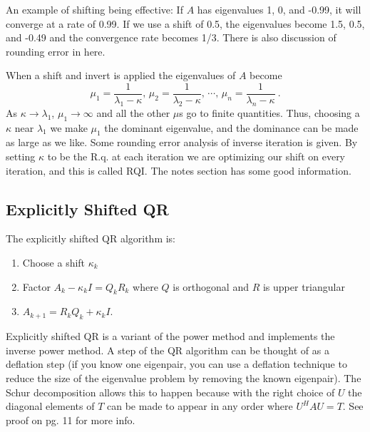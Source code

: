 \documentclass[12pt,twoside]{article}
\newcommand{\evall}{eigenvalue}
\newcommand{\evals}{eigenvalues }
\begin{document}
An example of shifting being effective: If $A$ has \evals 1, 0, and -0.99, it will converge at a rate of 0.99. If we use a shift of 0.5, the \evals become 1.5, 0.5, and -0.49 and the convergence rate becomes 1/3. There is also discussion of rounding error in here. 

When a shift and invert is applied the \evals of $A$ become 
%
\begin{equation}
  \mu_1 = \frac{1}{\lambda_1 - \kappa}\text{,   }  \mu_2 = \frac{1}{\lambda_2 - \kappa}\text{,   } \cdots\text{,   }  \mu_n = \frac{1}{\lambda_n - \kappa} \:.
\end{equation}
%
As $\kappa \to \lambda_1$, $\mu_1 \to \infty$ and all the other $\mu$s go to finite quantities. Thus, choosing a $\kappa$ near $\lambda_1$ we make $\mu_1$ the dominant \evall, and the dominance can be made as large as we like. Some rounding error analysis of inverse iteration is given. By setting $\kappa$ to be the R.q. at each iteration we are optimizing our shift on every iteration, and this is called RQI. The notes section has some good information. 

\subsection{Explicitly Shifted QR}
The explicitly shifted QR algorithm is:
\begin{enumerate}
  \item Choose a shift $\kappa_k$
  \item Factor $A_k - \kappa_k I = Q_k R_k$ where $Q$ is orthogonal and $R$ is upper triangular
  \item $A_{k+1} = R_kQ_k + \kappa_k I.$
\end{enumerate}

Explicitly shifted QR is a variant of the power method and implements the inverse power method. A step of the QR algorithm can be thought of as a deflation step (if you know one eigenpair, you can use a deflation technique to reduce the size of the eigenvalue problem by removing the known eigenpair). The Schur decomposition allows this to happen because with the right choice of $U$ the diagonal elements of $T$ can be made to appear in any order where $U^HAU=T$. See proof on pg. 11 for more info. 
\end{document}
